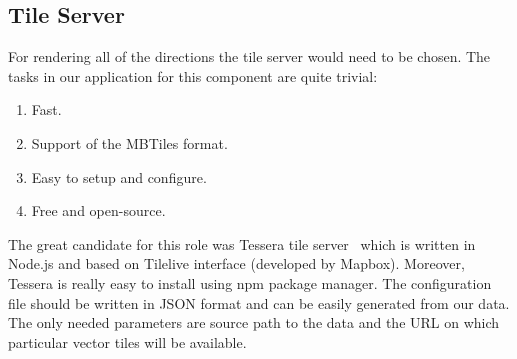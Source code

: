 \subsection{Tile Server}

For rendering all of the directions the tile server would need to be chosen. The tasks
in our application for this component are quite trivial:

\begin{enumerate}
  \item Fast.
  \item Support of the MBTiles format.
  \item Easy to setup and configure.
  \item Free and open-source.
\end{enumerate}

The great candidate for this role was Tessera tile server~\cite{gh:tessera} which is written in
Node.js and based on Tilelive interface (developed by Mapbox). Moreover, Tessera
is really easy to install using npm package manager. The configuration file should be
written in JSON format and can be easily generated from our data. The only needed parameters
are source path to the data and the URL on which particular vector tiles will be available.